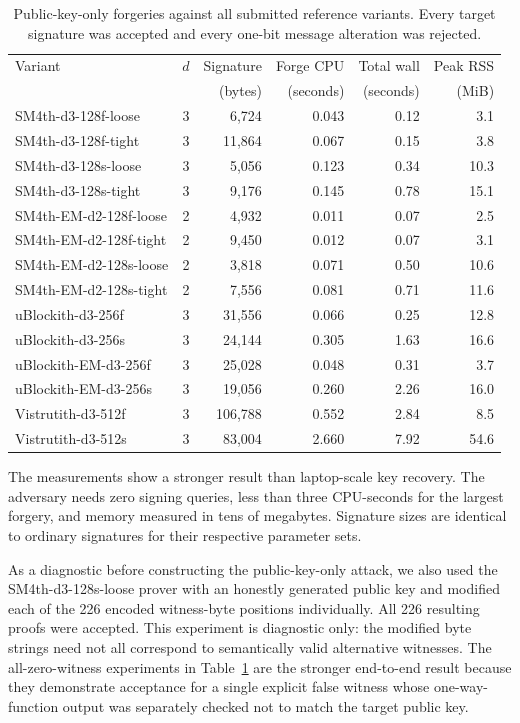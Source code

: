 \documentclass[11pt,a4paper]{article}
\begin{document}
\begin{table}[H]
\centering
\caption{Public-key-only forgeries against all submitted reference variants.
Every target signature was accepted and every one-bit message alteration was
rejected.}
\label{tab:results}
\scriptsize
\setlength{\tabcolsep}{3.3pt}
\begin{tabular}{@{}lrrrrr@{}}
\toprule
Variant & $d$ & Signature & Forge CPU & Total wall & Peak RSS \\
        &     & (bytes)   & (seconds) & (seconds)  & (MiB) \\
\midrule
SM4th-d3-128f-loose       & 3 &   6,724 & 0.043 & 0.12 &  3.1 \\
SM4th-d3-128f-tight       & 3 &  11,864 & 0.067 & 0.15 &  3.8 \\
SM4th-d3-128s-loose       & 3 &   5,056 & 0.123 & 0.34 & 10.3 \\
SM4th-d3-128s-tight       & 3 &   9,176 & 0.145 & 0.78 & 15.1 \\
SM4th-EM-d2-128f-loose    & 2 &   4,932 & 0.011 & 0.07 &  2.5 \\
SM4th-EM-d2-128f-tight    & 2 &   9,450 & 0.012 & 0.07 &  3.1 \\
SM4th-EM-d2-128s-loose    & 2 &   3,818 & 0.071 & 0.50 & 10.6 \\
SM4th-EM-d2-128s-tight    & 2 &   7,556 & 0.081 & 0.71 & 11.6 \\
uBlockith-d3-256f         & 3 &  31,556 & 0.066 & 0.25 & 12.8 \\
uBlockith-d3-256s         & 3 &  24,144 & 0.305 & 1.63 & 16.6 \\
uBlockith-EM-d3-256f      & 3 &  25,028 & 0.048 & 0.31 &  3.7 \\
uBlockith-EM-d3-256s      & 3 &  19,056 & 0.260 & 2.26 & 16.0 \\
Vistrutith-d3-512f        & 3 & 106,788 & 0.552 & 2.84 &  8.5 \\
Vistrutith-d3-512s        & 3 &  83,004 & 2.660 & 7.92 & 54.6 \\
\bottomrule
\end{tabular}
\end{table}

The measurements show a stronger result than laptop-scale key recovery.  The
adversary needs zero signing queries, less than three CPU-seconds for the
largest forgery, and memory measured in tens of megabytes.  Signature sizes
are identical to ordinary signatures for their respective parameter sets.

As a diagnostic before constructing the public-key-only attack, we also used
the SM4th-d3-128s-loose prover with an honestly generated public key and
modified each of the 226 encoded witness-byte positions individually.  All
226 resulting proofs were accepted.  This experiment is diagnostic only: the
modified byte strings need not all correspond to semantically valid alternative
witnesses.  The all-zero-witness experiments in Table~\ref{tab:results} are
the stronger end-to-end result because they demonstrate acceptance for a
single explicit false witness whose one-way-function output was separately
checked not to match the target public key.
\end{document}
